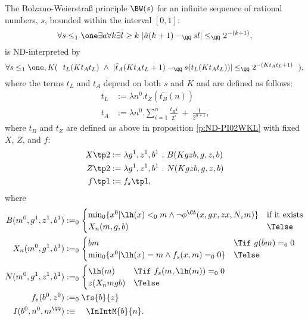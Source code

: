 \begin{cor}\label{c:ND-bw}
The Bolzano-Weierstra{\ss} principle $\BW(s)$ for an infinite sequence
of rational numbers, $s$, bounded within the interval $[0,1]$:
\[
\forall s\leq_1\one
  \exists a\forall k\exists l\geq k\ |\hat a(k+1)-_\QQ sl|\leq_\QQ2^{-(k+1)}
\text{,}
\]
is ND-interpreted by
\[
\forall s\leq_1\one, K
  (\ \ t_L(Kt_At_L)\ \wedge\ 
  |\hat t_A(Kt_At_L+1)-_\QQ s(t_L(Kt_At_L))|\leq_\QQ2^{-(Kt_At_L+1)}\ \ )
\text{,}
\]
where the terms $t_L$ and $t_A$ depend on both $s$ and $K$ and are defined as follows:
\begin{align*}
t_L&:=\lambda n^0.t_Z(\overline{t_B}(n))\\
t_A&:=\lambda n^0.\sum^{n}_{i=1}\frac{t_Bi}{2^i}\ +\ \frac{1}{2^{n+1}}
\text{,}
\end{align*}
where $t_B$ and $t_Z$ are defined as above in proposition \ref{p:ND-PI02WKL} 
with fixed $X$, $Z$, and $f$:
\begin{align*}
X\tp2&:=\lambda g^1,z^1,b^1\ .\ B(Kgzb,g,z,b)\\
Z\tp2&:=\lambda g^1,z^1,b^1\ .\ N(Kgzb,g,z,b)\\
f\tp1&:=f_s\tp1
\text{,}
\end{align*}
where
\begin{align*}
B(m^0,g^1,z^1,b^1)&:=_0
\begin{cases}
  {\min}_0 \{ x^0 | \lh(x)<_0 m \wedge \neg\phi^{\CA}(x,gx,zx,N_zm) \} &\text{if it exists} \\
  X_n(m,g,b)&\Telse
\end{cases}\\
X_n(m^0,g^1,b^1)&:=_0
  \begin{cases}
    \bar bm &\Tif\ g(\bar bm)=_00\\
    {\min}_0 \{ x^0 | \lh(x)=m \wedge f_s(x,m)=_00 \} &\Telse
  \end{cases}\\
N(m^0,g^1,z^1,b^1)&:=_0\begin{cases}
\lh(m) &\Tif\ f_s(m,\lh(m))=_00\\
z(X_nmgb) &\Telse
\end{cases}\\
        f_s(b^0,z^0)
                 &:=_0\fs{b}{z}\\
        I(b^0,n^0,m^\QQ)
                 &:\equiv\ \ \  \InIntM{b}{n}
\text{.}
\end{align*}
\end{cor}
%
%
